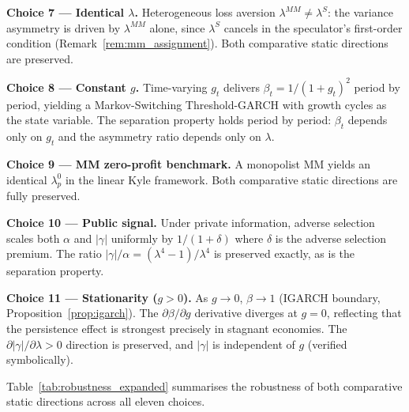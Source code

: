 \documentclass[12pt,a4paper]{article}
\theoremstyle{definition}
\begin{document}
\noindent\textbf{Choice 7 --- Identical $\lambda$.} Heterogeneous loss
aversion $\lambda^{MM} \neq \lambda^S$: the variance asymmetry is driven
by $\lambda^{MM}$ alone, since $\lambda^S$ cancels in the speculator's
first-order condition (Remark~\ref{rem:mm_assignment}). Both comparative
static directions are preserved.

\noindent\textbf{Choice 8 --- Constant $g$.} Time-varying $g_t$
delivers $\beta_t = 1/(1+g_t)^2$ period by period, yielding a
Markov-Switching Threshold-GARCH with growth cycles as the state variable.
The separation property holds period by period: $\beta_t$ depends only
on $g_t$ and the asymmetry ratio depends only on $\lambda$.

\noindent\textbf{Choice 9 --- MM zero-profit benchmark.} A monopolist MM
yields an identical $\lambda^0_p$ in the linear Kyle framework. Both
comparative static directions are fully preserved.

\noindent\textbf{Choice 10 --- Public signal.} Under private information,
adverse selection scales both $\alpha$ and $|\gamma|$ uniformly by
$1/(1+\delta)$ where $\delta$ is the adverse selection premium. The
ratio $|\gamma|/\alpha = (\lambda^4-1)/\lambda^4$ is preserved
exactly, as is the separation property.

\noindent\textbf{Choice 11 --- Stationarity ($g > 0$).} As $g \to 0$,
$\beta \to 1$ (IGARCH boundary, Proposition~\ref{prop:igarch}). The
$\partial\beta/\partial g$ derivative diverges at $g = 0$, reflecting
that the persistence effect is strongest precisely in stagnant economies.
The $\partial|\gamma|/\partial\lambda > 0$ direction is preserved, and
$|\gamma|$ is independent of $g$ (verified symbolically).

\medskip\noindent
Table~\ref{tab:robustness_expanded} summarises the robustness of both
comparative static directions across all eleven choices.
\end{document}
